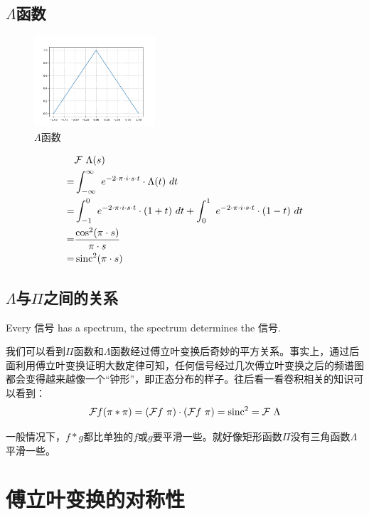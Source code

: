 \subsection{$\Lambda$函数}
\begin{figure}[H]
	\centering
	\includegraphics[width=0.4\textwidth]{assets/Figure_4.png}
	\caption{$\Lambda$函数}
\end{figure}
\begin{align*}
	  & \mathcal{F}\ \Lambda(s)                                                                                                              \\
	= & \int_{-\infty}^{\infty}\ e^{-2\cdot \pi\cdot i\cdot s\cdot t}\cdot \Lambda(t)\ dt                                                    \\
	= & \int_{-1}^{0}\ e^{-2\cdot \pi\cdot i\cdot s\cdot t}\cdot (1+t)\ dt+\int_{0}^{1}\ e^{-2\cdot \pi\cdot i\cdot s\cdot t}\cdot (1-t)\ dt \\
	= & \frac{\cos^2(\pi\cdot s)}{\pi\cdot s}                                                                                                \\
	= & \sinc^2(\pi\cdot s)
\end{align*}
\subsection{$\Lambda$与$\Pi$之间的关系}
Every 信号 has a spectrum, the spectrum determines the 信号.

我们可以看到$\Pi$函数和$\Lambda$函数经过傅立叶变换后奇妙的平方关系。事实上，通过后面利用傅立叶变换证明大数定律可知，任何信号经过几次傅立叶变换之后的频谱图都会变得越来越像一个“钟形”，即正态分布的样子。往后看一看卷积相关的知识可以看到：
$$
	\mathcal{F}f(\pi*\pi)=(\mathcal{F}f\ \pi)\cdot(\mathcal{F}f\ \pi)=\sinc^2=\mathcal{F}\ \Lambda
$$

一般情况下，$f*g$都比单独的$f$或$g$要平滑一些。就好像矩形函数$\Pi$没有三角函数$\Lambda$平滑一些。
\section{傅立叶变换的对称性}
